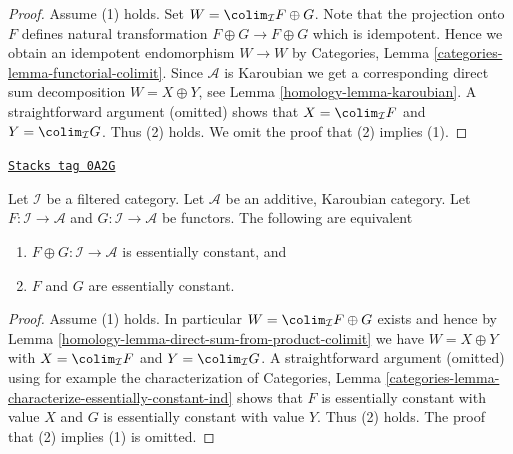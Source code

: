 \begin{proof}

Assume (1) holds. Set $W = \colim_\mathcal{I} F \oplus G$.
Note that the projection onto $F$ defines natural transformation
$F \oplus G \to F \oplus G$ which is idempotent. Hence we obtain
an idempotent endomorphism $W \to W$ by
Categories, Lemma \ref{categories-lemma-functorial-colimit}.
Since $\mathcal{A}$ is Karoubian we get a corresponding direct
sum decomposition $W = X \oplus Y$, see Lemma \ref{homology-lemma-karoubian}.
A straightforward argument (omitted) shows that
$X = \colim_\mathcal{I} F$ and $Y = \colim_\mathcal{I} G$.
Thus (2) holds. We omit the proof that (2) implies (1).
\end{proof}

\begin{lemma}
\label{homology-lemma-direct-sum-from-product-essentially-constant}
\href{https://stacks.math.columbia.edu/tag/0A2G}{\texttt{Stacks tag 0A2G}}

Let $\mathcal{I}$ be a filtered category. Let $\mathcal{A}$
be an additive, Karoubian category. Let $F : \mathcal{I} \to \mathcal{A}$ and
$G : \mathcal{I} \to \mathcal{A}$ be functors. The following are equivalent
\begin{enumerate}
\item $F \oplus G : \mathcal{I} \to \mathcal{A}$
is essentially constant, and
\item $F$ and $G$ are essentially constant.
\end{enumerate}
\end{lemma}

\begin{proof}

Assume (1) holds. In particular $W = \colim_\mathcal{I} F \oplus G$ exists
and hence by Lemma \ref{homology-lemma-direct-sum-from-product-colimit}
we have $W = X \oplus Y$ with $X = \colim_\mathcal{I} F$ and
$Y = \colim_\mathcal{I} G$. A straightforward argument (omitted)
using for example the characterization of
Categories, Lemma \ref{categories-lemma-characterize-essentially-constant-ind}
shows that $F$ is essentially constant with value $X$ and $G$ is essentially
constant with value $Y$. Thus (2) holds. The proof that (2) implies (1)
is omitted.
\end{proof}

